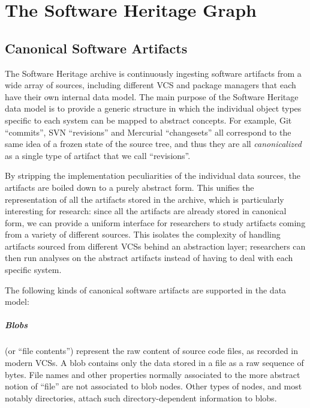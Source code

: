 \chapter{The Software Heritage Graph}%
\label{chp:swh-model}


\section{Canonical Software Artifacts}%
\label{sec:swh-artifacts}

The Software Heritage archive is continuously ingesting software artifacts from
a wide array of sources, including different VCS and package managers that
each have their own internal data model. The main purpose of the Software
Heritage data model is to provide a generic structure in which the individual
object types specific to each system can be mapped to abstract concepts. For
example, Git ``commits'', SVN ``revisions'' and Mercurial ``changesets'' all
correspond to the same idea of a frozen state of the source tree, and thus they
are all \emph{canonicalized} as a single type of artifact that we call
``revisions''.

By stripping the implementation peculiarities of the individual data sources,
the artifacts are boiled down to a purely abstract form. This unifies the
representation of all the artifacts stored in the archive, which is
particularly interesting for research: since all the artifacts are already
stored in canonical form, we can provide a uniform interface for researchers
to study artifacts coming from a variety of different sources. This isolates
the complexity of handling artifacts sourced from different \glspl{VCS} behind
an abstraction layer; researchers can then run analyses on the abstract
artifacts instead of having to deal with each specific system.

The following kinds of canonical software artifacts are supported in the data
model:

\begin{figure}\centering
{}
\end{figure}
\paragraph{\textbf{Blobs}} (or ``file contents'') represent the raw content of
source code files, as recorded in modern \glspl{VCS}. A blob contains only the
data stored in a file as a raw sequence of bytes. File names and other
properties normally associated to the more abstract notion of ``file'' are not
associated to blob nodes. Other types of nodes, and most notably directories,
attach such directory-dependent information to blobs.


